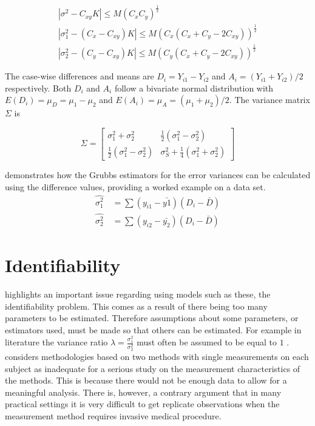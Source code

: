 \documentclass[12pt, a4paper]{report}
\theoremstyle{plain}
\theoremstyle{definition}
\theoremstyle{remark}
\begin{document}
	\begin{eqnarray}
	|\sigma^2-C_{xy}K|\leqslant M(C_{x}C_{y})^{\frac{1}{2}}\\
	|\sigma^2_{1}-(C_{x}-C_{xy})K|\leqslant M(C_{x}(C_{x}+C_{y}-2C_{xy}))^{\frac{1}{2}}\nonumber\\
	|\sigma^2_{2}-(C_{y}-C_{xy})K|\leqslant
	M(C_{y}(C_{x}+C_{y}-2C_{xy}))^{\frac{1}{2}}\nonumber
	\end{eqnarray}
	
	The case-wise differences and means are $D_{i} = Y_{i1}-Y_{i2}$
	and $A_{i} = (Y_{i1}+Y_{i2})/2$  respectively. Both $D_{i}$ and
	$A_{i}$ follow a bivariate normal distribution with $E(D_{i})=
	\mu_{D} = \mu_{1} - \mu_{2}$ and $E(A_{i})= \mu_{A} = (\mu_{1} +
	\mu_{2})/2$. The variance matrix $\Sigma$ is
	
	\begin{equation}
	\Sigma = \left[\begin{matrix}
	\sigma^{2}_{1}+\sigma^{2}_{2}&\frac{1}{2}(\sigma^{2}_{1}-\sigma^{2}_{2})\\
	\frac{1}{2}(\sigma^{2}_{1}-\sigma^{2}_{2})&\sigma^{2}_{S}+
	\frac{1}{4}(\sigma^{2}_{1}+\sigma^{2}_{2})
	\end{matrix} \right]
	\end{equation}
	
	
	
	
	
	\citet{Kinsella} demonstrates how the Grubbs estimators for the
	error variances can be calculated using the difference values,
	providing a worked example on a data set.
	\begin{eqnarray}
	\hat{\sigma^{2}_{1}}
	\quad=\sum{(y_{i1}-\bar{y{1}})(D_{i}-\bar{D})}\\
	\hat{\sigma^{2}_{2}} \quad=
	\sum{(y_{i2}-\bar{y_{2}})(D_{i}-\bar{D})} \nonumber
	\end{eqnarray}
	
	
	
	
	
	\section{Identifiability}
	\citet{DunnSEME} highlights an important issue regarding using
	models such as these, the identifiability problem. This comes as a
	result of there being too many parameters to be estimated.
	Therefore assumptions about some parameters, or estimators used,
	must be made so that others can be estimated. For example in literature the variance
	ratio $\lambda=\frac{\sigma^{2}_{1}}{\sigma^{2}_{2}}$
	must often be assumed to be equal to $1$ \citep{linnet98}.\citet{DunnSEME} considers methodologies based on two methods with single measurements on each subject as inadequate for a serious
	study on the measurement characteristics of the methods. This is
	because there would not be enough data to allow for a meaningful
	analysis. There is, however, a contrary argument that in many
	practical settings it is very difficult to get replicate
	observations when the measurement method requires invasive medical
	procedure.
	
\end{document}
